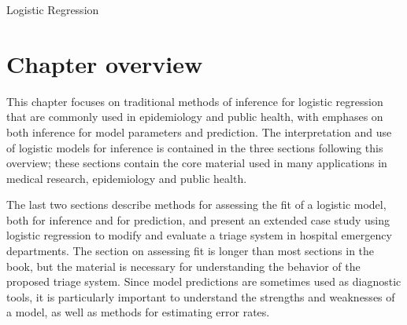 \begin{chapterpage}{Logistic Regression}
   \label{LogisticRegression}
 \end{chapterpage}

\renewcommand{\chapterfolder}{ch_logistic_regression_oi_biostat}

\noindent%




\setlength\parindent{20pt}

\section{Chapter overview}
\label{chapterOverview}

This chapter focuses on traditional methods of inference for logistic regression that are commonly used in epidemiology and public health, with emphases on both inference for model parameters and prediction.  The interpretation and use of logistic models for inference is contained in the three sections following this overview; these sections contain the core material used in many applications in medical research, epidemiology and public health.  

The last two sections describe methods for assessing the fit of a logistic model, both for inference and for prediction, and present an extended case study using logistic regression to modify and evaluate a triage system in hospital emergency departments.  The section on assessing fit is longer than most sections in the book, but the material is necessary for understanding the behavior of the  proposed triage system. Since model predictions are sometimes used as diagnostic tools, it is particularly important to understand the strengths and weaknesses of a model, as well as methods for estimating error rates.

